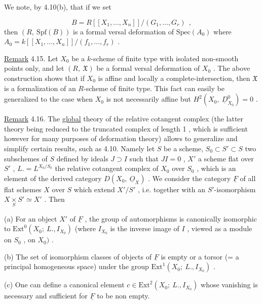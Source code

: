 We note, by 4.10(b), that if we set

\begin{equation*}
B = R[[X_1,\ldots,X_n]]/(G_1,\ldots,G_r)\ \ ,
\end{equation*}
then  $(R,\ \mathrm{Spf}(B))$  is a formal versal deformation of  $\mathrm{Spec}(A_0)$  where  $A_0 = k[[X_1,\ldots,X_n]]/(f_1,\ldots,f_r)$  .

\underline{Remark} 4.15.  Let  $X_0$  be a $k$-scheme of finite type with isolated non-smooth points only, and let  $(R,\ \mathfrak{X})$  be a formal versal deformation of  $X_0$  . The above construction shows that if  $X_0$  is affine and locally a complete-intersection, then  $\mathfrak{X}$  is a formalization of an $R$-scheme of finite type. This fact can easily be generalized to the case when  $X_0$  is not necessarily affine but  $H^2(X_0,\ \underline{D}^0_{X_0}) = 0$  .

\underline{Remark} 4.16.  The \underline{global}  theory of the relative cotangent complex (the latter theory being reduced to the truncated complex of length 1 , which is sufficient however for many purposes of deformation theory) allows to generalize and simplify certain results, such as 4.10. Namely let  $S$  be a scheme,  $S_0 \subset S' \subset S$  two subschemes of  $S$  defined by ideals  $J \supset I$  such that  $JI = 0$  ,  $X'$  a scheme flat over  $S'$  ,  $L. = L^{X_0/S_0}$  the relative cotangent complex of  $X_0$  over  $S_0$  , which is an element of the derived category  $D(X_0,\ \underline{O}_X)$  . We consider the category  $\underline{F}$  of all flat schemes  $X$  over  $S$  which extend  $X'/S'$  , i.e. together with an  $S'$-isomorphism  $X \underset{S}{\times} S' \simeq X'$  . Then

(a)  For an object  $X'$  of  $\underline{F}$  , the group of automorphisms is canonically isomorphic to  $\mathrm{Ext}^0(X_0;\ L.,I_{X_0})$  (where  $I_{X_0}$  is the inverse image of  $I$  , viewed as a module on  $S_0$  , on  $X_0)$  .



(b)  The set of isomorphism classes of objects of  $\underline{F}$  is empty or a torsor (= a principal homogeneous space) under the group  $\mathrm{Ext}^1(X_0;\ L.,I_{X_0})$  .

(c)  One can define a canonical element  $c \in \mathrm{Ext}^2(X_0;\ L.,I_{X_0})$  whose vanishing is necessary and sufficient for  $\underline{F}$  to be non empty.

